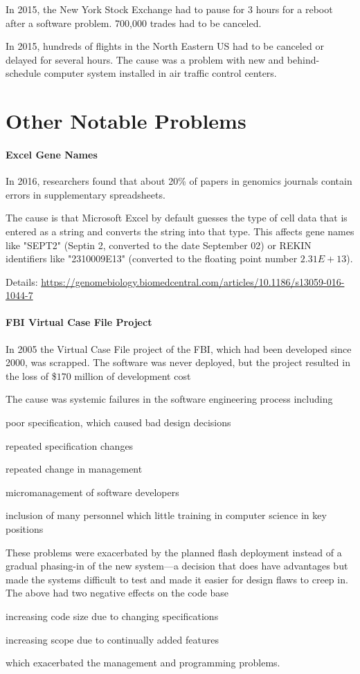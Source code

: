 In 2015, the New York Stock Exchange had to pause for $3$ hours for a reboot after a software problem.
700,000 trades had to be canceled.

In 2015, hundreds of flights in the North Eastern US had to be canceled or delayed for several hours.
The cause was a problem with new and behind-schedule computer system installed in air traffic control centers.

\section{Other Notable Problems}

\paragraph{Excel Gene Names}
In 2016, researchers found that about 20\% of papers in genomics journals contain errors in supplementary spreadsheets.

The cause is that Microsoft Excel by default guesses the type of cell data that is entered as a string and converts the string into that type.
This affects gene names like "SEPT2" (Septin 2, converted to the date September 02) or REKIN identifiers like "2310009E13" (converted to the floating point number $2.31E+13$).

Details: \url{https://genomebiology.biomedcentral.com/articles/10.1186/s13059-016-1044-7}

\paragraph{FBI Virtual Case File Project}
In 2005 the Virtual Case File project of the FBI, which had been developed since 2000, was scrapped.
The software was never deployed, but the project resulted in the loss of \$$170$ million of development cost

The cause was systemic failures in the software engineering process including
\begin{compactitem}
 \item poor specification, which caused bad design decisions
 \item repeated specification changes
 \item repeated change in management
 \item micromanagement of software developers
 \item inclusion of many personnel which little training in computer science in key positions
\end{compactitem}
These problems were exacerbated by the planned flash deployment instead of a gradual phasing-in of the new system---a decision that does have advantages but made the systems difficult to test and made it easier for design flaws to creep in.
The above had two negative effects on the code base
\begin{compactitem}
 \item increasing code size due to changing specifications
 \item increasing scope due to continually added features
\end{compactitem}
which exacerbated the management and programming problems.

